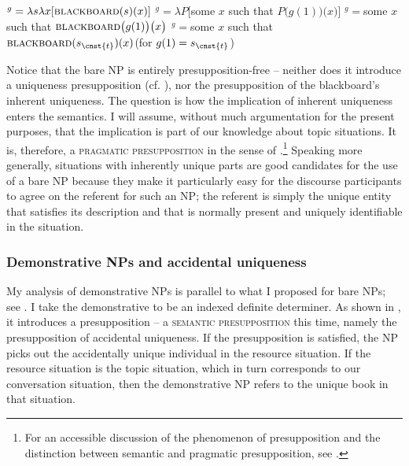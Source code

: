 \documentclass[output=paper,colorlinks,citecolor=brown,newtxmath]{langscibook}
\begin{document}
\ea \label{simik:comp:bare-NP}
\ea {}$^g=\lambda s\lambda x[\textsc{blackboard}(s)(x)]$
\ex {}$^g=\lambda P\big[$some $x$ such that $P\big(g(1)\big)\big(x\big)\big]$
\ex {}$^g={}$some $x$ such that $\textsc{blackboard}\big(g(1)\big)\big(x\big)$
\ex {}$^g={}$some $x$ such that $\textsc{blackboard}(s_{\cnst{t}})(x)$\hfill (for $g(1)=s_{\cnst{t}}$)
\z\z

\noindent Notice that the bare NP is entirely presupposition-free -- neither does it introduce a uniqueness presupposition (cf. \citealt{Dayal2004}), nor the presupposition of the blackboard's inherent uniqueness. The question is how the implication of inherent uniqueness enters the semantics. I will assume, without much argumentation for the present purposes, that the implication is part of our knowledge about topic situations. It is, therefore, a \textsc{pragmatic presupposition} in the sense of \citet{Stalnaker1974}.\footnote{For an accessible discussion of the phenomenon of presupposition and the distinction between semantic and pragmatic presupposition, see \citet{Beaver.Geurts2014}.} Speaking more generally, situations with inherently unique parts are good candidates for the use of a bare NP because they make it particularly easy for the discourse participants to agree on the referent for such an NP; the referent is simply the unique entity that satisfies its description and that is normally present and uniquely identifiable in the situation.


\subsubsection{Demonstrative NPs and accidental uniqueness}\label{simik:sec:dem-nps-accidental}

My analysis of demonstrative NPs is parallel to what I proposed for bare NPs; see . I take the demonstrative to be an indexed definite determiner. As shown in , it introduces a presupposition -- a \textsc{semantic presupposition} this time, namely the presupposition of accidental uniqueness. If the presupposition is satisfied, the NP picks out the accidentally unique individual in the resource situation. If the resource situation is the topic situation, which in turn corresponds to our conversation situation, then the demonstrative NP refers to the unique book in that situation.
\end{document}
